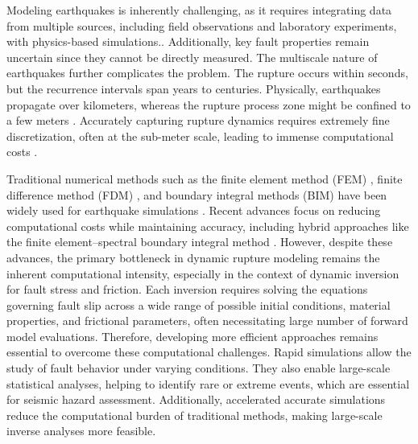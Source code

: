 \documentclass[draft]{agujournal2019}
\begin{document}
Modeling earthquakes is inherently challenging, as it requires integrating data from multiple sources, including field observations and laboratory experiments, with physics-based simulations.\cite{johnson2006frictional,Gallovic2019-method, gallovivc2019bayesian,aochi2020imaging,van2019modeling}. Additionally, key fault properties remain uncertain since they cannot be directly measured. The multiscale nature of earthquakes further complicates the problem. The rupture occurs within seconds, but the recurrence intervals span years to centuries. Physically, earthquakes propagate over kilometers, whereas the rupture process zone might be confined to a few meters \cite{lapusta2000elastodynamic,ben2008collective,chester1998ultracataclasite}. Accurately capturing rupture dynamics requires extremely fine discretization, often at the sub-meter scale, leading to immense computational costs \cite{Ulrich2019}.

Traditional numerical methods such as the finite element method (FEM) \cite{oglesby1998earthquakes,oglesby2000three,aagaard2001dynamic}, finite difference method (FDM) \cite{andrews1973numerical,day1982three,madariaga1998modeling,andrews1999test,dalguer2007staggered,moczo2007finite}, and boundary integral methods (BIM) \cite{das1980numerical,andrews1985dynamic,cochard1994dynamic,geubelle1995spectral} have been widely used for earthquake simulations . Recent advances focus on reducing computational costs while maintaining accuracy, including hybrid approaches like the finite element–spectral boundary integral method \cite{ma2019hybrid, abdelmeguid2019novel,abdelmeguid2022modeling}. However, despite these advances, the primary bottleneck in dynamic rupture modeling remains the inherent computational intensity, especially in the context of dynamic inversion for fault stress and friction. Each inversion requires solving the equations governing fault slip across a wide range of possible initial conditions, material properties, and frictional parameters, often necessitating large number of forward model evaluations. Therefore, developing more efficient approaches remains essential to overcome these computational challenges. Rapid simulations allow the study of fault behavior under varying conditions. They also enable large-scale statistical analyses, helping to identify rare or extreme events, which are essential for seismic hazard assessment. Additionally, accelerated accurate simulations reduce the computational burden of traditional methods, making large-scale inverse analyses more feasible.
\end{document}
